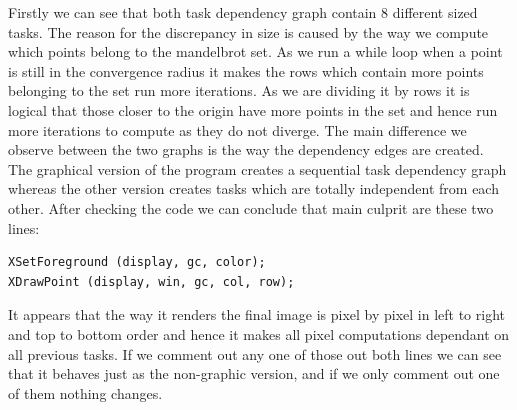 \documentclass[11pt]{article}
\begin{document}
\FloatBarrier
Firstly we can see that both task dependency graph contain 8 different sized tasks. The reason for the discrepancy in size is caused by the way we compute which points belong to the mandelbrot set. As we run a while loop when a point is still in the convergence radius it makes the rows which contain more points belonging to the set run more iterations. As we are dividing it by rows it is logical that those closer to the origin have more points in the set and hence run more iterations to compute as they do not diverge.
The main difference we observe between the two graphs is the way the dependency edges are created. The graphical version of the program creates a sequential task dependency graph whereas the other version creates tasks which are totally independent from each other. After checking the code we can conclude that main culprit are these two lines:
\begin{verbatim}
XSetForeground (display, gc, color);
XDrawPoint (display, win, gc, col, row);
\end{verbatim}
It appears that the way it renders the final image is pixel by pixel in left to right and top to bottom order and hence it makes all pixel computations dependant on all previous tasks. If we comment out any one of those out both lines we can see that it behaves just as the non-graphic version, and if we only comment out one of them nothing changes.
\end{document}
